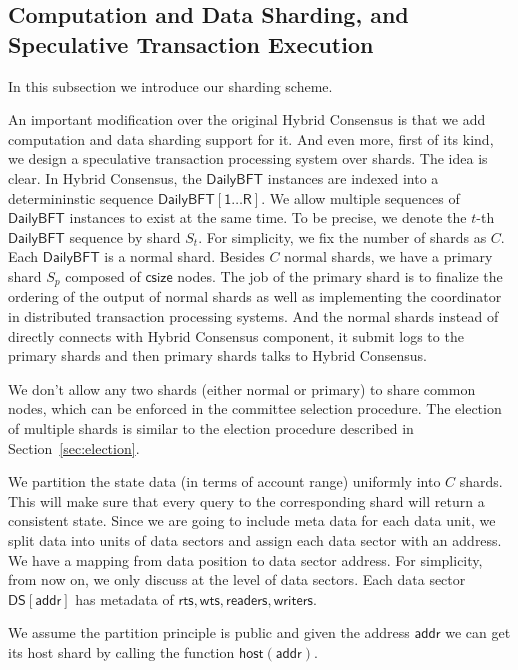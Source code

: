 \subsection{Computation and Data Sharding, and Speculative Transaction Execution}
In this subsection we introduce our sharding scheme.

An important modification over the original Hybrid Consensus is that we add computation and data sharding support for it. And even more, first of its kind,
we design a speculative transaction processing system over shards. The idea is clear. In Hybrid Consensus, the $\mathsf{DailyBFT}$ instances are indexed into
a determininstic sequence $\mathsf{DailyBFT[1\dots R]}$. We allow multiple sequences of $\mathsf{DailyBFT}$ instances to exist at the same time. To be precise,
we denote the $t$-th $\mathsf{DailyBFT}$ sequence by shard $S_t$. For simplicity, we fix the number of shards as $C$. Each $\mathsf{DailyBFT}$ is a normal shard.
Besides $C$ normal shards, we have a primary shard $S_p$ composed of $\mathsf{csize}$ nodes. The job of the primary shard is to finalize the ordering of the
output of normal shards as well as implementing the coordinator in distributed transaction processing systems. And the normal shards instead of directly connects
with Hybrid Consensus component, it submit logs to the primary shards and then primary shards talks to Hybrid Consensus.

We don't allow any two shards (either normal or primary) to share common nodes, which can be enforced in the committee selection procedure. The election of
multiple shards is similar to the election procedure described in Section~\ref{sec:election}.

We partition the state data (in terms of account range) uniformly into $C$ shards. This will make sure that every query to the corresponding shard will return
a consistent state. Since we are going to include meta data for each data unit, we split data into units of data sectors and assign each data sector with an
address. We have a mapping from data position to data sector address. For simplicity, from now on, we only discuss at the level of data sectors. Each
data sector $\mathsf{DS[addr]}$ has metadata of $\mathsf{rts, wts, readers, writers}$.

We assume the partition principle is public and given the address $\mathsf{addr}$ we can get its host shard by calling the function $\mathsf{host(addr)}$.

